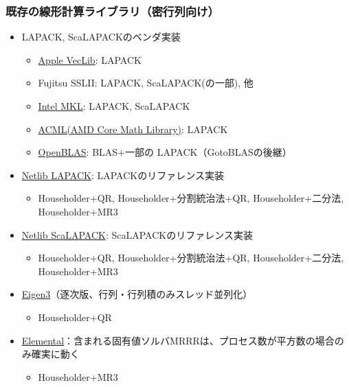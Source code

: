 \begin{frame}
  \frametitle{既存の線形計算ライブラリ（密行列向け）}
  \begin{itemize}
  \item LAPACK, ScaLAPACKのベンダ実装
    \begin{itemize}
    \item \href{https://developer.apple.com/library/mac/documentation/Performance/Conceptual/vecLib/Reference/reference.html}{Apple VecLib}: LAPACK
    \item Fujitsu SSLII: LAPACK, ScaLAPACK(の一部), 他
    \item \href{https://software.intel.com/en-us/mkl_11.1_ref}{Intel MKL}: LAPACK, ScaLAPACK
    \item
      \href{http://developer.amd.com/tools-and-sdks/cpu-development/amd-core-math-library-acml/}{ACML(AMD
        Core Math Library)}: LAPACK
    \item \href{http://www.openblas.net}{OpenBLAS}: BLAS+一部の
      LAPACK（GotoBLASの後継）

    \end{itemize}
  \item \href{http://www.netlib.org/lapack/}{Netlib LAPACK}: LAPACKのリファレンス実装
    \begin{itemize}
      \item Householder+QR, Householder+分割統治法+QR, Householder+二分法, Householder+MR3
    \end{itemize}
  \item \href{http://www.netlib.org/scalapack/}{Netlib ScaLAPACK}: ScaLAPACKのリファレンス実装
    \begin{itemize}
      \item Householder+QR, Householder+分割統治法+QR, Householder+二分法, Householder+MR3
    \end{itemize}
  \item \href{http://eigen.tuxfamily.org/}{Eigen3}（逐次版、行列・行列積のみスレッド並列化）
    \begin{itemize}
      \item Householder+QR
    \end{itemize}
  \item \href{http://libelemental.org}{Elemental}：含まれる固有値ソルバMRRRは、プロセス数が平方数の場合のみ確実に動く
    \begin{itemize}
      \item Householder+MR3
    \end{itemize}
  \end{itemize}
\end{frame}

